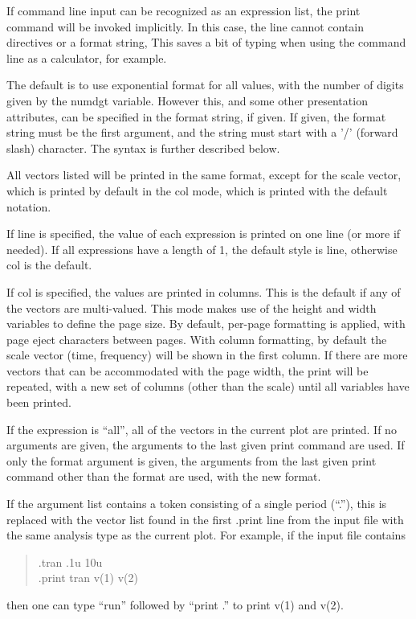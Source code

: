If command line input can be recognized as an expression list, the
print command will be invoked implicitly.  In this case, the line
cannot contain directives or a format string, This saves a bit of
typing when using the {\WRspice} command line as a calculator, for
example.

The default is to use exponential format for all values, with the
number of digits given by the {\et numdgt} variable.  However this,
and some other presentation attributes, can be specified in the format
string, if given.  If given, the format string must be the first
argument, and the string must start with a '/' (forward slash)
character.  The syntax is further described below.

All vectors listed will be printed in the same format, except for the
scale vector, which is printed by default in the {\vt col} mode, which
is printed with the default notation.

If {\vt line} is specified, the value of each expression is printed on
one line (or more if needed).  If all expressions have a length of 1,
the default style is {\vt line}, otherwise {\vt col} is the default.

If {\vt col} is specified, the values are printed in columns.  This is
the default if any of the vectors are multi-valued.  This mode makes
use of the {\vt height} and {\vt width} variables to define the page
size.  By default, per-page formatting is applied, with page eject
characters between pages.  With column formatting, by default the
scale vector ({\et time}, {\et frequency}) will be shown in the first
column.  If there are more vectors that can be accommodated with the
page width, the print will be repeated, with a new set of columns
(other than the scale) until all variables have been printed.

If the expression is ``{\vt all}'', all of the vectors in the current
plot are printed.  If no arguments are given, the arguments to the
last given {\cb print} command are used.  If only the format argument
is given, the arguments from the last given {\cb print} command other
than the format are used, with the new format.

If the argument list contains a token consisting of a single period
(``.''), this is replaced with the vector list found in the first {\vt
.print} line from the input file with the same analysis type as the
current plot.  For example, if the input file contains
\begin{quote}\vt
    .tran .1u 10u\\
    .print tran v(1) v(2)\\
\end{quote}
then one can type ``{\vt run}'' followed by ``{\vt print .}'' to print
{\vt v(1)} and {\vt v(2)}.

